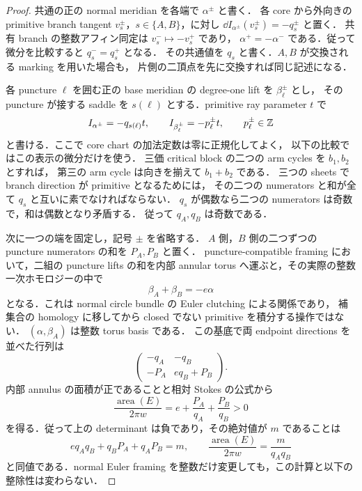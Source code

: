 \begin{proof}
共通の正の normal meridian を各端で $\alpha^\pm$ と書く．
各 core から外向きの primitive branch tangent $v_s^\pm$，$s\in\{A,B\}$，に対し
$\dd I_{\alpha^\pm}(v_s^\pm)=-q_s^\pm$ と置く．
共有 branch の整数アフィン同定は $v_s^-\mapsto-v_s^+$ であり，
$\alpha^+=-\alpha^-$ である．従って微分を比較すると $q_s^-=q_s^+$ となる．
その共通値を $q_s$ と書く．$A,B$ が交換される marking を用いた場合も，
片側の二頂点を先に交換すれば同じ記述になる．

各 puncture $\ell$ を囲む正の base meridian の degree-one lift を $\beta_\ell^\pm$ とし，
その puncture が接する saddle を $s(\ell)$ とする．primitive ray parameter $t$ で
\[
 I_{\alpha^\pm}=-q_{s(\ell)}t,
 \qquad I_{\beta_\ell^\pm}=-p_\ell^\pm t,
 \qquad p_\ell^\pm\in\mathbb Z
\]
と書ける．ここで core chart の加法定数は零に正規化してよく，
以下の比較ではこの表示の微分だけを使う．
三価 critical block の二つの arm cycles を $b_1,b_2$ とすれば，
第三の arm cycle は向きを揃えて $b_1+b_2$ である．
三つの sheets で branch direction が primitive となるためには，
その二つの numerators と和が全て $q_s$ と互いに素でなければならない．
$q_s$ が偶数なら二つの numerators は奇数で，和は偶数となり矛盾する．
従って $q_A,q_B$ は奇数である．

次に一つの端を固定し，記号 $\pm$ を省略する．
$A$ 側，$B$ 側の二つずつの puncture numerators の和を $P_A,P_B$ と置く．
puncture-compatible framing において，二組の puncture lifts の和を内部 annular torus
へ運ぶと，その実際の整数一次ホモロジーの中で
\[
 \beta_A+\beta_B=-e\alpha
\]
となる．これは normal circle bundle の Euler clutching による関係であり，
補集合の homology に移してから closed でない primitive を積分する操作ではない．
$(\alpha,\beta_A)$ は整数 torus basis である．
この基底で両 endpoint directions を並べた行列は
\[
 \begin{pmatrix}
 -q_A&-q_B\\
 -P_A&e q_B+P_B
 \end{pmatrix}.
\]
内部 annulus の面積が正であることと相対 Stokes の公式から
\[
 \frac{\operatorname{area}(E)}{2\pi w}
 =e+\frac{P_A}{q_A}+\frac{P_B}{q_B}>0
\]
を得る．従って上の determinant は負であり，その絶対値が $m$ であることは
\begin{equation}\label{q9:annular-index-equation}
 e q_Aq_B+q_BP_A+q_AP_B=m,
 \qquad
 \frac{\operatorname{area}(E)}{2\pi w}=\frac{m}{q_Aq_B}
\end{equation}
と同値である．normal Euler framing を整数だけ変更しても，この計算と以下の整除性は変わらない．


\end{proof}
